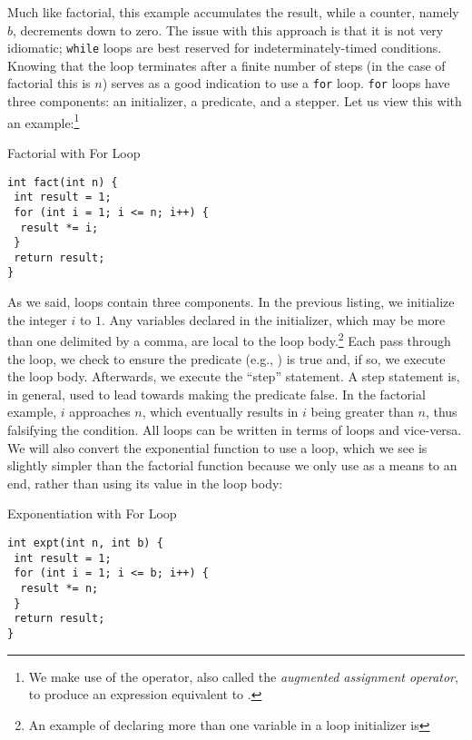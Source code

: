 Much like factorial, this example accumulates the result, while a counter, namely $b$, decrements down to zero. The issue with this approach is that it is not very idiomatic; \texttt{while} loops are best reserved for indeterminately-timed conditions. Knowing that the loop terminates after a finite number of steps (in the case of factorial this is $n$) serves as a good indication to use a \texttt{for} loop. \texttt{for} loops have three components: an initializer, a predicate, and a stepper. Let us view this with an example:\footnote{We make use of the \ttt{*=} operator, also called the \textit{augmented assignment operator}, to produce an expression equivalent to .}

\begin{cl}[main.c]{Factorial with For Loop}
\begin{lstlisting}[language=MyC]
int fact(int n) {
 int result = 1;
 for (int i = 1; i <= n; i++) {
  result *= i;
 }
 return result;
}
\end{lstlisting}
\end{cl}

As we said, \for loops contain three components. In the previous listing, we initialize the integer $i$ to $1$. Any variables declared in the initializer, which may be more than one delimited by a comma, are local to the loop body.\footnote{An example of declaring more than one variable in a \for loop initializer is } Each pass through the loop, we check to ensure the predicate (e.g., ) is true and, if so, we execute the loop body. Afterwards, we execute the ``step'' statement. A step statement is, in general, used to lead towards making the predicate false. In the factorial example, $i$ approaches $n$, which eventually results in $i$ being greater than $n$, thus falsifying the condition. All \for loops can be written in terms of \while loops and vice-versa. We will also convert the exponential function to use a \for loop, which we see is slightly simpler than the factorial function because we only use  as a means to an end, rather than using its value in the loop body:

\begin{cl}[main.c]{Exponentiation with For Loop}
\begin{lstlisting}[language=MyC]
int expt(int n, int b) {
 int result = 1;
 for (int i = 1; i <= b; i++) {
  result *= n;
 }
 return result;
}
\end{lstlisting}
\end{cl}

